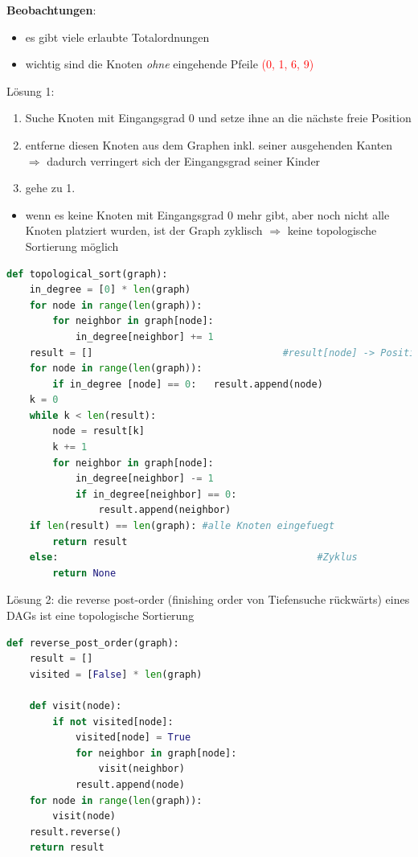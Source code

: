 \documentclass[11pt, fleqn]{scrreprt}
\begin{document}
	\textbf{Beobachtungen}:
	\begin{itemize}
		\item es gibt viele erlaubte Totalordnungen
		\item wichtig sind die Knoten \emph{ohne} eingehende Pfeile \textcolor{red}{(0, 1, 6, 9)}
	\end{itemize}
	
	Lösung 1: 
	\begin{enumerate}
		\item Suche Knoten mit Eingangsgrad 0 und setze ihne an die nächste freie Position
		\item entferne diesen Knoten aus dem Graphen inkl. seiner ausgehenden Kanten\\
		$\Rightarrow$ dadurch verringert sich der Eingangsgrad seiner Kinder
		\item gehe zu 1.
	\end{enumerate}
	\begin{itemize}[label={}]
		\item wenn es keine Knoten mit Eingangsgrad 0 mehr gibt, aber noch nicht alle Knoten platziert wurden, ist der Graph zyklisch $\Rightarrow$ keine topologische Sortierung möglich
	\end{itemize}
	
	
	\begin{lstlisting}[language=Python]
def topological_sort(graph):
	in_degree = [0] * len(graph)
	for node in range(len(graph)):
		for neighbor in graph[node]:
			in_degree[neighbor] += 1
	result = []     							#result[node] -> Position von node auf der Geraden
	for node in range(len(graph)):
		if in_degree [node] == 0:   result.append(node)
	k = 0
	while k < len(result):
		node = result[k]
		k += 1
		for neighbor in graph[node]:
			in_degree[neighbor] -= 1
			if in_degree[neighbor] == 0:
				result.append(neighbor)
	if len(result) == len(graph): #alle Knoten eingefuegt
		return result
	else:  											  #Zyklus
		return None
	\end{lstlisting}
	
	
	Lösung 2: die reverse post-order (finishing order von Tiefensuche rückwärts) eines DAGs ist eine topologische Sortierung
	
	\begin{lstlisting}[language=Python]
def reverse_post_order(graph):
	result = []
	visited = [False] * len(graph)
	
	def visit(node):
		if not visited[node]:
			visited[node] = True
			for neighbor in graph[node]:
				visit(neighbor)
			result.append(node)
	for node in range(len(graph)):
		visit(node)
	result.reverse()
	return result
	\end{lstlisting}
	
\end{document}
